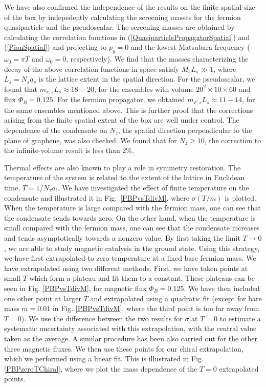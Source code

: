 \documentclass[aps,prd,twocolumn,showpacs,superscriptaddress,groupedaddress]{revtex4}  %
\begin{document}
We have also confirmed the independence of the results on the finite spatial size of the box by indepedently calculating the screening
masses for the fermion quasiparticle and the pseudoscalar. The screening masses are obtained by calculating the correlation functions in (\ref{QuasiparticlePropagatorSpatial}) and (\ref{PionSpatial}) and projecting to $p_y=0$ and the lowest Matsubara frequency ($\omega_0 = \pi T$ and $\omega_0 = 0$, respectively).
We find that the masses characterizing the decay of the above correlation functions in space satisfy $M_s L_s \gg 1$, where $L_s = N_s a_s$ is the  lattice extent in the spatial direction. For the pseudoscalar, we found that $m_{\pi,s}L_s \approx 18-20$, for the ensembles with volume $20^2\times10\times60$ and flux $\Phi_B=0.125$. For the fermion propagator, we obtained $m_{F,s}L_s \approx 11-14$, for the same ensembles mentioned above. This is further proof that the corrections arising from the finite spatial extent of the box are well under control. The dependence of the condensate on $N_z$, the spatial direction perpendicular to the plane of graphene, was also checked. We found that for $N_z \geq 10$, the correction to the infinite-volume result is less than $2\%$.
 
Thermal effects are also known to play a role in symmetry restoration. The temperature of the system is related to the extent of the lattice in Euclidean time, $T = 1/N_{\tau}a_t$. We have investigated the effect of finite temperature on the condensate and illustrated it in Fig.~\ref{PBPvsTdivM}, where $\sigma(T/m)$ is plotted. When the temperature is large 
compared with the fermion mass, one can see that the condensate tends towards zero. On the other hand, when the temperature is small compared with the fermion mass, one can see that the condensate increases and tends asymptotically towards a nonzero value. By first taking the limit $T \to 0$, we are able to study magnetic catalysis in the ground state. Using this strategy, we have first extrapolated to zero temperature at a fixed bare fermion mass. We have extrapolated using two different methods. First, we have taken points at small $T$ which form a plateau and fit them to a constant. These plateaus can be seen in Fig. \ref{PBPvsTdivM}, for magnetic flux $\Phi_B=0.125$. We have then included one other point at larger $T$ and extrapolated using a quadratic fit (except for bare mass $m=0.01$ in Fig. \ref{PBPvsTdivM}, where the third point is too far away from $T=0$). We use the difference between the two results for $\sigma$ at $T=0$ to estimate a systematic uncertainty associated with this extrapolation, with the central value taken as the average. A similar procedure has been also carried out for the other three magnetic fluxes. We then use these points for our chiral extrapolation, which we performed using a linear fit. This is illustrated in Fig. \ref{PBPzeroTChiral}, where we plot the mass dependence of the $T=0$ extrapolated points.
\end{document}
